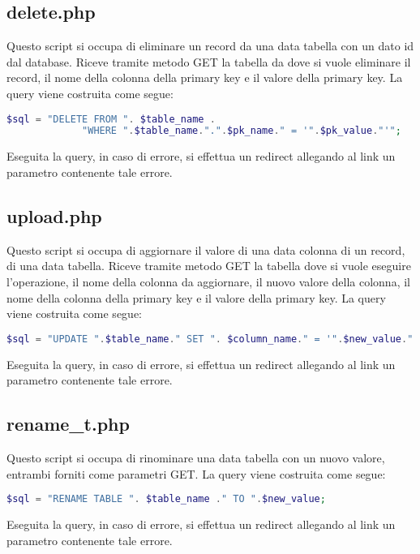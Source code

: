 \subsection{delete.php}
Questo script si occupa di eliminare un record da una data tabella con un dato id dal database. \newline Riceve tramite metodo GET la tabella da dove si vuole eliminare il record, il nome della colonna della primary key e il valore della primary key.
\newline
La query viene costruita come segue:
\begin{lstlisting}[language=PHP]
$sql = "DELETE FROM ". $table_name . 
			 "WHERE ".$table_name.".".$pk_name." = '".$pk_value."'";
\end{lstlisting}
Eseguita la query, in caso di errore, si effettua un redirect allegando al link un parametro contenente tale errore.

\subsection{upload.php}
Questo script si occupa di aggiornare il valore di una data colonna di un record, di una data tabella. \newline
Riceve tramite metodo GET la tabella dove si vuole eseguire l'operazione, il nome della colonna da aggiornare, il nuovo valore della colonna, il nome della colonna della primary key e il valore della primary key. \newline
La query viene costruita come segue:
\begin{lstlisting}[language=PHP]
$sql = "UPDATE ".$table_name." SET ". $column_name." = '".$new_value."' WHERE ".$table_name.".".$pk_name." = ".$pk_value; 
\end{lstlisting}
Eseguita la query, in caso di errore, si effettua un redirect allegando al link un parametro contenente tale errore.

\subsection{rename\_t.php}
Questo script si occupa di rinominare una data tabella con un nuovo valore, entrambi forniti come parametri GET. \newline
La query viene costruita come segue:
\begin{lstlisting}[language=PHP]
$sql = "RENAME TABLE ". $table_name ." TO ".$new_value;
\end{lstlisting}
Eseguita la query, in caso di errore, si effettua un redirect allegando al link un parametro contenente tale errore.


